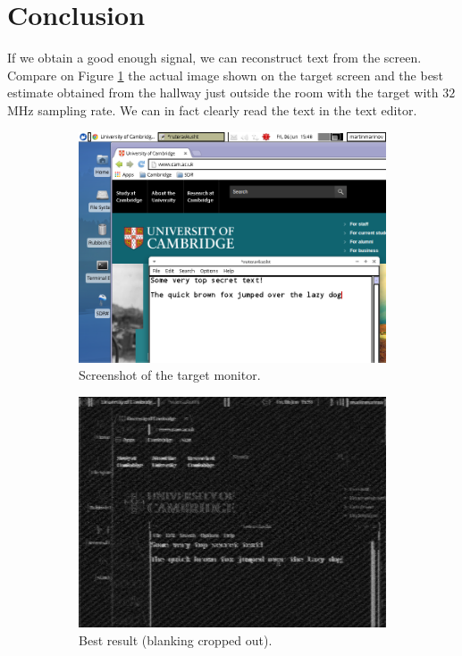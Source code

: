\documentclass[a4paper,12pt,twoside,openright]{report}
\begin{document}
\section{Conclusion}

If we obtain a good enough signal, we can reconstruct text from the screen. Compare on Figure \ref{fig:demobest} the actual image shown on the target screen and the best estimate obtained from the hallway just outside the room with the target with $32$ MHz sampling rate. We can in fact clearly read the text in the text editor.

\begin{figure}[p!]
\centering
\begin{subfigure}[b]{0.9\textwidth}
  \includegraphics[width=\textwidth]{demo_actual}
  \caption{Screenshot of the target monitor.}
\end{subfigure}
\begin{subfigure}[b]{0.9\textwidth}
  \includegraphics[width=\textwidth]{demo_bestresult}
  \caption{Best result (blanking cropped out).}
\end{subfigure}
  \caption{}
  \label{fig:demobest}
\end{figure}
\end{document}
